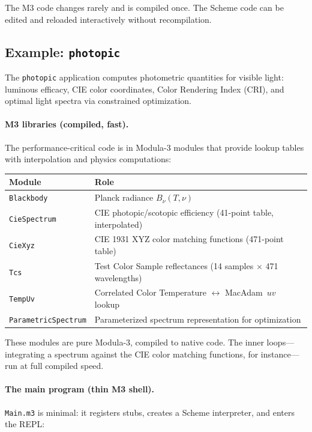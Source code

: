 \documentclass[12pt]{report}
\begin{document}
\noindent The M3 code changes rarely and is compiled once.  The
Scheme code can be edited and reloaded interactively without
recompilation.

\subsection{Example: {\tt photopic}}

The {\tt photopic} application computes photometric quantities
for visible light: luminous efficacy, CIE color coordinates, Color
Rendering Index (CRI), and optimal light spectra via constrained
optimization.

\paragraph{M3 libraries (compiled, fast).}
The performance-critical code is in Modula-3 modules that provide
lookup tables with interpolation and physics computations:

\begin{center}
\begin{tabular}{lp{3in}}
\toprule
\textbf{Module} & \textbf{Role} \\
\midrule
{\tt Blackbody} & Planck radiance $B_\nu(T,\nu)$ \\
{\tt CieSpectrum} & CIE photopic/scotopic efficiency (41-point table, interpolated) \\
{\tt CieXyz} & CIE 1931 XYZ color matching functions (471-point table) \\
{\tt Tcs} & Test Color Sample reflectances (14 samples $\times$ 471 wavelengths) \\
{\tt TempUv} & Correlated Color Temperature $\leftrightarrow$ MacAdam~$uv$ lookup \\
{\tt ParametricSpectrum} & Parameterized spectrum representation for optimization \\
\bottomrule
\end{tabular}
\end{center}

\noindent These modules are pure Modula-3, compiled to native code.
The inner loops---integrating a spectrum against the CIE color
matching functions, for instance---run at full compiled speed.

\paragraph{The main program (thin M3 shell).}
{\tt Main.m3} is minimal: it registers stubs, creates a Scheme
interpreter, and enters the REPL:
\end{document}
